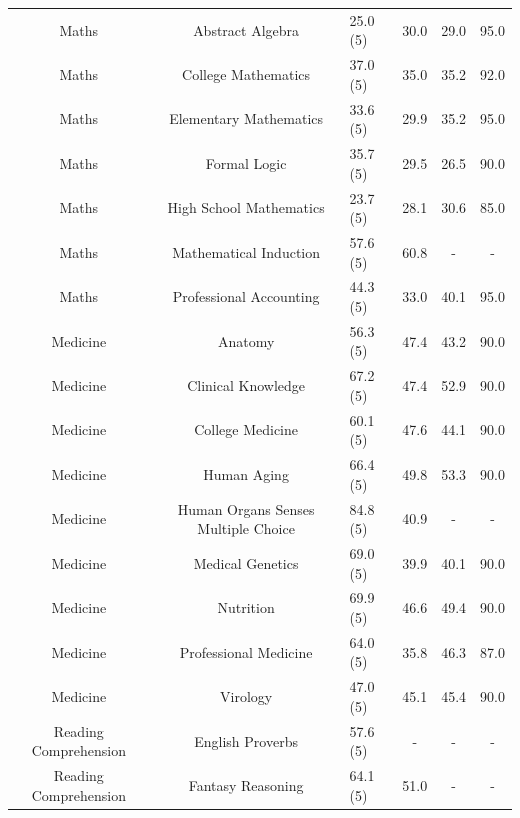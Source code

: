 \documentclass[11pt, a4paper, logo, internal, copyright, nonumbering]{deepmind}
\begin{document}
\begin{center}
\begin{longtable}{cclccc}
                  Maths &                     Abstract Algebra &   25.0 (5) &  30.0 &  29.0 &         95.0 \\
                  Maths &                  College Mathematics &   37.0 (5) &  35.0 &  35.2 &         92.0 \\
                  Maths &               Elementary Mathematics &   33.6 (5) &  29.9 &  35.2 &         95.0 \\
                  Maths &                         Formal Logic &   35.7 (5) &  29.5 &  26.5 &         90.0 \\
                  Maths &              High School Mathematics &   23.7 (5) &  28.1 &  30.6 &         85.0 \\
                  Maths &                Mathematical Induction &   57.6 (5) &  60.8 &   - &          - \\
                  Maths &              Professional Accounting &   44.3 (5) &  33.0 &  40.1 &         95.0 \\
               Medicine &                              Anatomy &   56.3 (5) &  47.4 &  43.2 &         90.0 \\
               Medicine &                   Clinical Knowledge &   67.2 (5) &  47.4 &  52.9 &         90.0 \\
               Medicine &                     College Medicine &   60.1 (5) &  47.6 &  44.1 &         90.0 \\
               Medicine &                          Human Aging &   66.4 (5) &  49.8 &  53.3 &         90.0 \\
               Medicine &   Human Organs Senses Multiple Choice &   84.8 (5) &  40.9 &   - &          - \\
               Medicine &                     Medical Genetics &   69.0 (5) &  39.9 &  40.1 &         90.0 \\
               Medicine &                            Nutrition &   69.9 (5) &  46.6 &  49.4 &         90.0 \\
               Medicine &                Professional Medicine &   64.0 (5) &  35.8 &  46.3 &         87.0 \\
               Medicine &                             Virology &   47.0 (5) &  45.1 &  45.4 &         90.0 \\
  Reading Comprehension &                      English Proverbs &   57.6 (5) &   - &   - &          - \\
  Reading Comprehension &                     Fantasy Reasoning &   64.1 (5) &  51.0 &   - &          - \\

\end{longtable}
\end{center}
\end{document}
